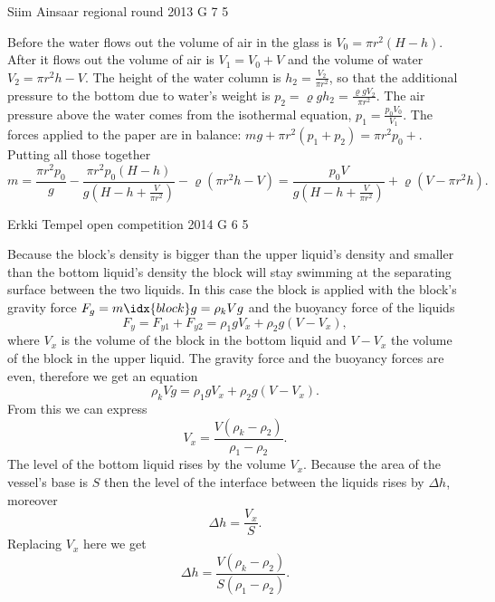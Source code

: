 \documentclass[11pt]{article}
\begin{document}
{Siim Ainsaar} %
{regional round} %
{2013} %
{G 7} %
{5} %
{

\ifEngSolution
Before the water flows out the volume of air in the glass is $V_0 = \pi r^2 (H-h)$. After it flows out the volume of air is $V_1 = V_0 + V$ and the volume of water $V_2 = \pi r^2 h - V$. The height of the water column is $h_2 = \frac{ V_2 }{ \pi r^2 }$, so that the additional pressure to the bottom due to water’s weight is $p_2 = \varrho g h_2 = \frac{ \varrho g V_2 }{ \pi r^2 }$. The air pressure above the water comes from the isothermal equation, $p_1 = \frac{p_0 V_0}{V_1}$. The forces applied to the paper are in balance: $mg + \pi r^2 (p_1 + p_2) = \pi r^2 p_0+$. Putting all those together
\[ m =
\frac{ \pi r^2 p_0 }{ g } -
\frac{ \pi r^2 p_0 (H-h) }{ g \left( H - h + \frac{V}{\pi r^2} \right) } -
\varrho \left( \pi r^2 h - V \right)
=
\frac{ p_0 V }{ g \left( H - h + \frac{V}{ \pi r^2 } \right) } + \varrho \left( V - \pi r^2 h \right).
\]
\fi
}

{Erkki Tempel} %
{open competition} %
{2014} %
{G 6} %
{5} %
{

\ifEngSolution
Because the block’s density is bigger than the upper liquid’s density and smaller than the bottom liquid’s density the block will stay swimming at the separating surface between the two liquids. In this case the block is applied with the block’s gravity force $F_g = m\idx{block}g=\rho_k Vg$ and the buoyancy force of the liquids 
\[ F_y=F_{y1}+F_{y2}=\rho_1gV_x + \rho_2g(V-V_x), \]
where $V_x$ is the volume of the block in the bottom liquid and $V-V_x$ the volume of the block in the upper liquid. The gravity force and the buoyancy forces are even, therefore we get an equation 
\[ \rho_k Vg = \rho_1gV_x + \rho_2g(V-V_x). \]
From this we can express
\[ V_x = \frac{V(\rho_k-\rho_2)}{\rho_1-\rho_2}. \]
The level of the bottom liquid rises by the volume $V_x$. Because the area of the vessel’s base is $S$ then the level of the interface between the liquids rises by $\Delta h$, moreover
\[ \Delta h = \frac{V_x}{S}. \]
Replacing $V_x$ here we get
\[ \Delta h = \frac{V(\rho_k-\rho_2)}{S(\rho_1-\rho_2)}. \]
\fi
}
\end{document}
